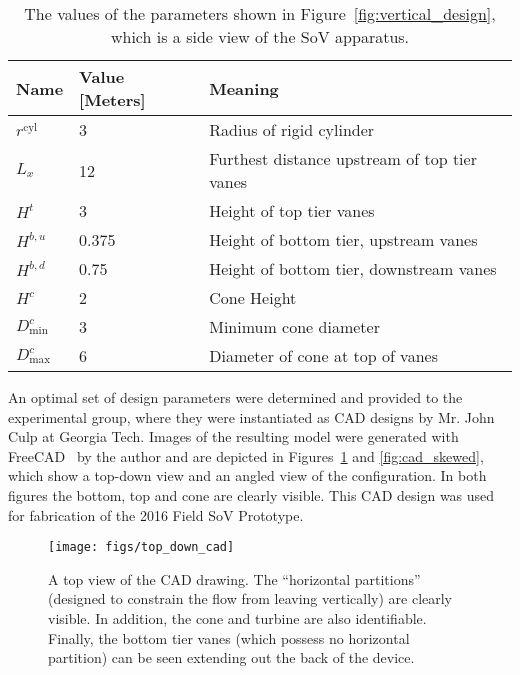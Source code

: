 \begin{table}[]
 \caption{The values of the parameters shown in
 Figure~\ref{fig:vertical_design}, which is a side view of the SoV
 apparatus.} 
\centering
\begin{tabular}{l|l|l}
Name                        & Value [Meters] & Meaning                    \\
 \hline
$r^{\text{cyl}}$            &   3   & Radius of rigid cylinder \\
$L_x$                       &  12   & Furthest distance upstream of top	 tier vanes \\
 $H^t    $                  &   3   & Height of top tier vanes \\
 $H^{b,u}$                  & 0.375 & Height of bottom tier, upstream vanes \\
 $H^{b,d}$                  & 0.75  & Height of bottom tier, downstream vanes \\
 $H^{c}$                    &   2   & Cone Height \\
 $D^c_{\text{min}}    $     &   3   & Minimum cone diameter \\
 $D^c_{\text{max}}    $     &   6   & Diameter of cone at top of vanes\\
\end{tabular}
 \label{tab:side}
\end{table}

An optimal set of design parameters were determined and provided to the
experimental group, where they were instantiated as CAD designs by
Mr. John Culp at Georgia Tech. Images of the resulting model were generated
with FreeCAD~\cite{Falck} by the author and are
depicted in Figures~\ref{fig:top_down_cad} and \ref{fig:cad_skewed},
which show a top-down view and an angled 
view of the configuration. In both figures the bottom, top and cone are
clearly visible. This CAD design was used for
fabrication of the 2016 Field SoV Prototype. 

\begin{figure}[!htb]
  \begin{center}
   \texttt{[image: figs/top\_down\_cad]}
   \caption{A top view of the CAD drawing. The ``horizontal partitions''
   (designed to constrain the flow from leaving vertically) are clearly
   visible. In addition, the cone and turbine are also
   identifiable. Finally, the bottom tier vanes (which possess no
   horizontal partition) can be seen extending out the back of the
   device.} 
   \label{fig:top_down_cad}
  \end{center}
 \end{figure}

